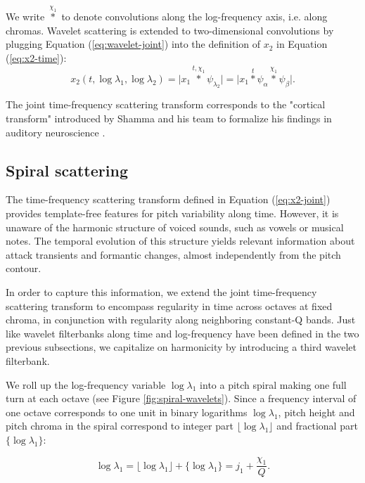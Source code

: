\documentclass[twoside,a4paper]{article}
\begin{document}
We write $\overset{\chi_{1}}{\ast}$ to denote convolutions along the log-frequency axis, i.e. along chromas.  Wavelet scattering is extended to two-dimensional convolutions by plugging Equation (\ref{eq:wavelet-joint}) into the definition of $x_2$ in Equation (\ref{eq:x2-time}):
\begin{equation}
x_{2}(t,\log \lambda_{1},\log \lambda_{2}) =
\vert x_{1} \overset{t, \chi_{1}}{\ast} \psi_{\lambda_{2}} \vert =
\vert x_{1} \overset{t}{\ast} \psi_{\alpha} \overset{\chi_{1}}{\ast} \psi_{\beta} \vert.
\label{eq:x2-joint}
\end{equation}

The joint time-frequency scattering transform corresponds to the "cortical transform" introduced by Shamma and his team to formalize his findings in auditory neuroscience \cite{Patil2012}.



\subsection{Spiral scattering}

The time-frequency scattering transform defined in Equation (\ref{eq:x2-joint}) provides template-free features for pitch variability along time. However, it is unaware of the harmonic structure of voiced sounds, such as vowels or musical notes. The temporal evolution of this structure yields relevant information about attack transients and formantic changes, almost independently from the pitch contour.

In order to capture this information, we extend the joint time-frequency scattering transform to encompass regularity in time across octaves at fixed chroma, in conjunction with regularity along neighboring constant-Q bands. Just like wavelet filterbanks along time and log-frequency have been defined in the two previous subsections, we capitalize on harmonicity by introducing a third wavelet filterbank.

We roll up the log-frequency variable $\log \lambda_1$ into a pitch spiral making one full turn at each octave (see Figure \ref{fig:spiral-wavelets}). Since a frequency interval of one octave corresponds to one unit in binary logarithms $\log \lambda_1$, pitch height and pitch chroma in the spiral correspond to integer part $\lfloor \log \lambda_1 \rfloor$ and fractional part $\{ \log \lambda_1 \}$:

\begin{equation}
\log \lambda_1 = \lfloor \log \lambda_1 \rfloor + \{ \log \lambda_1 \} = j_1 + \frac{\chi_1}{Q}.
\label{eq:integer-part and fractional part}
\end{equation}
\end{document}
